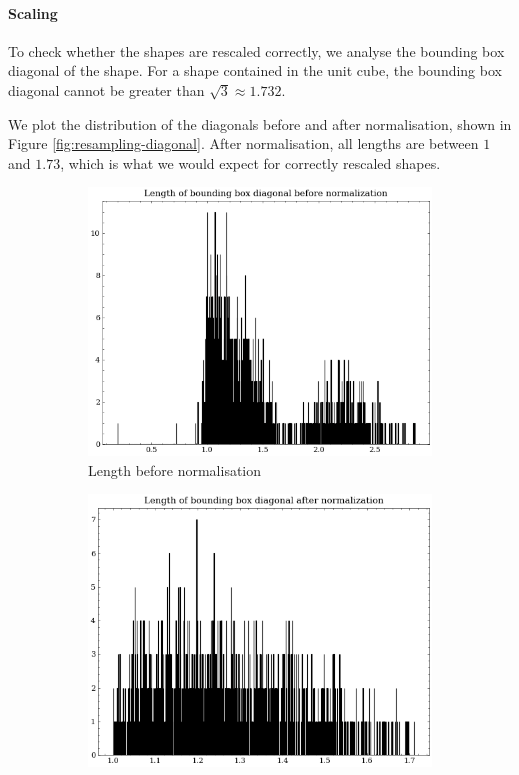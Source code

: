 \paragraph{Scaling}
To check whether the shapes are rescaled correctly, we analyse the bounding box diagonal of the shape.
For a shape contained in the unit cube, the bounding box diagonal cannot be greater than $\sqrt{3} \approx 1.732$.

We plot the distribution of the diagonals before and after normalisation, shown in Figure \ref{fig:resampling-diagonal}.
After normalisation, all lengths are between $1$ and $1.73$, which is what we would expect for correctly rescaled shapes.

\begin{figure}[ht]
    \centering
    \begin{subfigure}[b]{0.45\textwidth}
        \centering
        \includegraphics[width=\textwidth]{assets/preprocessing/Length_of_bounding_box_diagonal_before_normalization.png}
        \caption{Length before normalisation}
        \label{fig:resampling-diagonal-before}
    \end{subfigure}
    \hfill
    \begin{subfigure}[b]{0.45\textwidth}
        \centering
        \includegraphics[width=\textwidth]{assets/preprocessing/Length_of_bounding_box_diagonal_after_normalization.png}

\end{subfigure}
\end{figure}
